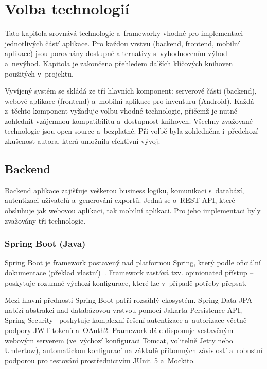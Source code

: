 \chapter{Volba technologií}\label{chap:technologies}

\begin{chapterabstract}
	Tato kapitola srovnává technologie a~frameworky vhodné pro implementaci jednotlivých částí aplikace. Pro každou vrstvu (backend, frontend, mobilní aplikace) jsou porovnány dostupné alternativy s~vyhodnocením výhod a~nevýhod. Kapitola je zakončena přehledem dalších klíčových knihoven použitých v~projektu.
\end{chapterabstract}

Vyvíjený systém se skládá ze tří hlavních komponent: serverové části (backend), webové aplikace (frontend) a~mobilní aplikace pro inventuru (Android). Každá z~těchto komponent vyžaduje volbu vhodné technologie, přičemž je nutné zohlednit vzájemnou kompatibilitu a~dostupnost knihoven. Všechny zvažované technologie jsou open-source a~bezplatné. Při volbě byla zohledněna i~předchozí zkušenost autora, která umožnila efektivní vývoj.

\section{Backend}

Backend aplikace zajišťuje veškerou business logiku, komunikaci s~databází, autentizaci uživatelů a~generování exportů. Jedná se o~REST API, které obsluhuje jak webovou aplikaci, tak mobilní aplikaci. Pro jeho implementaci byly zvažovány tři technologie.

\subsection{Spring Boot (Java)}

Spring Boot je framework postavený nad platformou Spring, který podle oficiální dokumentace  (překlad vlastní)~\cite{springboot}. Framework zastává tzv. opinionated přístup -- poskytuje rozumné výchozí konfigurace, které lze v~případě potřeby přepsat.

Mezi hlavní přednosti Spring Boot patří rozsáhlý ekosystém. Spring Data JPA~\cite{springdatajpa} nabízí abstrakci nad databázovou vrstvou pomocí Jakarta Persistence API, Spring Security~\cite{springsecurity} poskytuje komplexní řešení autentizace a~autorizace včetně podpory JWT tokenů a~OAuth2. Framework dále disponuje vestavěným webovým serverem (ve~výchozí konfiguraci Tomcat, volitelně Jetty nebo Undertow), automatickou konfigurací na základě přítomných závislostí a~robustní podporou pro testování prostřednictvím JUnit~5 a~Mockito.

